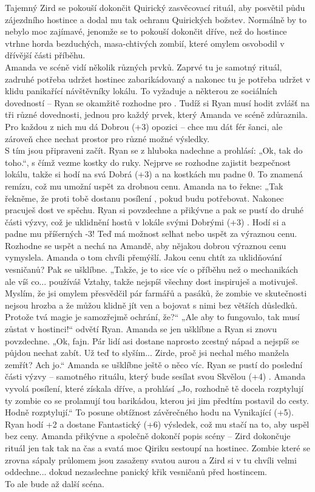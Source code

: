 \documentclass[../main.tex]{subfiles}
\begin{document}
Tajemný Zird se pokouší dokončit Quirický zasvěcovací rituál, aby posvětil půdu zájezdního hostince a dodal mu tak ochranu Quirických božstev. Normálně by to nebylo moc zajímavé, jenomže se to pokouší dokončit dříve, než do hostince vtrhne horda bezduchých, masa-chtivých zombií, které omylem osvobodil v dřívější části příběhu.\\
Amanda ve scéně vidí několik různých prvků. Zaprvé tu je samotný rituál, zadruhé potřeba udržet hostinec zabarikádovaný a nakonec tu je potřeba udržet v klidu panikařící návštěvníky lokálu. To vyžaduje a některou ze sociálních dovedností – Ryan se okamžitě rozhodne pro . Tudíž si Ryan musí hodit zvlášť na tři různé dovednosti, jednou pro každý prvek, který Amanda ve scéně zdůraznila. Pro každou z nich mu dá Dobrou (+3) opozici – chce mu dát fér šanci, ale zároveň chce nechat prostor pro různé možné výsledky.\\
S tím jsou připraveni začít. Ryan se z hluboka nadechne a prohlásí: „Ok, tak do toho.“, s čímž vezme kostky do ruky. Nejprve se rozhodne zajistit bezpečnost lokálu, takže si hodí na svá Dobrá (+3)  a na kostkách mu padne 0. To znamená remízu, což mu umožní uspět za drobnou cenu. Amanda na to řekne: „Tak řekněme, že proti tobě dostanu posílení , pokud budu potřebovat. Nakonec pracuješ dost ve spěchu. Ryan si povzdechne a přikývne a pak se pustí do druhé části výzvy, což je uklidnění hostů v lokále svými Dobrými (+3) . Hodí si a padne mu příšerných -3! Teď má možnost selhat nebo uspět za výraznou cenu. Rozhodne se uspět a nechá na Amandě, aby nějakou dobrou výraznou cenu vymyslela. Amanda o tom chvíli přemýšlí. Jakou cenu chtít za uklidňování vesničanů? Pak se ušklíbne. „Takže, je to sice víc o příběhu než o mechanikách ale víš co... používáš Vztahy, takže nejspíš všechny dost inspiruješ a motivuješ. Myslím, že jsi omylem přesvědčil pár farmářů a pasáků, že zombie ve skutečnosti nejsou hrozba a že můžou klidně jít ven a bojovat s nimi bez větších důsledků. Protože tvá magie je samozřejmě ochrání, že?“ „Ale aby to fungovalo, tak musí zůstat v hostinci!“ odvětí Ryan. Amanda se jen ušklíbne a Ryan si znovu povzdechne. „Ok, fajn. Pár lidí asi dostane naprosto zcestný nápad a nejspíš se půjdou nechat zabít. Už teď to slyším... Zirde, proč jsi nechal mého manžela zemřít? Ach jo.“ Amanda se ušklíbne ještě o něco víc. Ryan se pustí do poslední části výzvy – samotného rituálu, který bude sesílat svou Skvělou (+4) . Amanda vyvolá posílení, které získala dříve, a prohlásí „Jo, rozhodně tě docela rozptylují ty zombie co se prolamují tou barikádou, kterou jsi jim předtím postavil do cesty. Hodně rozptylují.“ To posune obtížnost závěrečného hodu na Vynikající (+5). Ryan hodí +2 a dostane Fantastický (+6) výsledek, což mu stačí na to, aby uspěl bez ceny. Amanda přikývne a společně dokončí popis scény – Zird dokončuje rituál jen tak tak na čas a svatá moc Qiriku sestoupí na hostinec. Zombie které se zrovna sápaly průlomem jsou zasaženy svatou aurou a Zird si v tu chvíli velmi oddechne... dokud nezaslechne panický křik vesničanů před hostincem.\\
To ale bude až další scéna.
\end{document}
